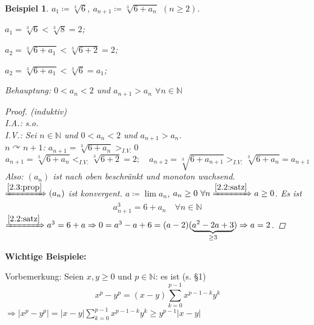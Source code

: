 \documentclass[12pt]{extreport} %
\newcommand{\N}{\mathbb{N}}
\theoremstyle{named}
\theoremstyle{dotless}
\newtheorem*{beispiel*}{Beispiel}
\begin{document}
\begin{beispiel*} $a_{1} \coloneqq \sqrt[3]{6}$, $a_{n + 1} \coloneqq \sqrt[3]{6 + a_{n}}$ $(n \geq 2)$.
	\begin{description}
		\item $a_{1} = \sqrt[3]{6} < \sqrt[3]{8} = 2$;
		\item $a_{2} = \sqrt[3]{6 + a_{1}} < \sqrt[3]{6 + 2} = 2$;
		\item $a_{2} = \sqrt[3]{6 + a_{1}} < \sqrt[3]{6} = a_{1}$;
	\end{description}
	Behauptung: $0 < a_{n} < 2$ und $a_{n + 1} > a_{n}$ $\forall n \in \N$

	\begin{proof}(induktiv) \\
		I.A.: s.o. \\
		I.V.: Sei $n \in \N$ und $0 < a_{n} < 2$ und $a_{n+1} > a_{n}$. \\
		$n \curvearrowright n + 1$: $a_{n + 1} = \sqrt[3]{6 + a_{n}} >_{I.V.} 0$
		$$
			a_{n +1} = \sqrt[3]{6 + a_{n}} <_{I.V.} \sqrt[3]{6 + 2} = 2; \quad a_{n + 2} = \sqrt[3]{6 + a_{n+1}} >_{I.V.} \sqrt[3]{6 + a_{n}} = a_{n + 1}
		$$
		Also: $(a_{n})$ ist nach oben beschränkt und monoton wachsend. \\
		$\xRightarrow[]{\ref{2.3:prop}} (a_{n})$ ist konvergent. $a \coloneqq \lim a_{n}$, $a_{n} \geq 0 ~\forall n \xRightarrow[]{\ref{2.2:satz}} a \geq 0$. Es ist
		$$
			a_{n+1}^{3} = 6 + a_{n} \quad \forall n \in \N
		$$
		$\xRightarrow[]{\ref{2.2:satz}} a^{3} = 6 + a \Rightarrow 0 = a^{3} - a + 6 = (a-2)(\underbrace{a^{2}-2a+3}_{\geq 3}) \Rightarrow a = 2$.
	\end{proof}
\end{beispiel*}


\textbf{Wichtige Beispiele:} 


Vorbemerkung: Seien $x, y \geq 0$ und $p \in \N$: es ist (s. \S 1)
	$$ x^{p} - y^{p} = (x - y) \sum_{k = 0}^{p-1} x^{p-1-k}y^{k} $$
$\Rightarrow |x^{p} - y^{p}| = |x-y| \sum_{k=0}^{p-1} x^{p-1-k}y^{k} \geq y^{p-1} |x - y|$
\end{document}
